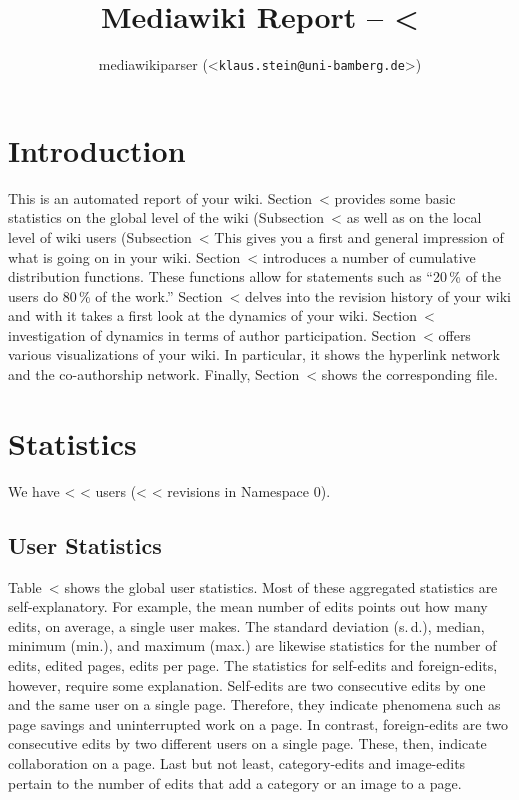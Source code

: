 \documentclass{scrartcl}
\title{Mediawiki Report -- <%
}
\author{mediawikiparser (<\texttt{klaus.stein@uni-bamberg.de}>)}
\begin{document}
\maketitle

\section{Introduction} %
\label{sec:introduction}

This is an automated report of your wiki. 
Section~<%
provides some basic statistics on the global level of the wiki 
(Subsection~<%
as well as on the local level of wiki users 
(Subsection~<%
This gives you a first and general impression of what is 
going on in your wiki. 
Section~<%
introduces a number of cumulative distribution functions. 
These functions allow for statements such as ``20\,\% of 
the users do 80\,\% of the work.'' 
Section~<%
delves into the revision history of your wiki and with it takes a 
first look at the dynamics of your wiki. 
Section~<%
investigation of dynamics in terms of author participation. 
Section~<%
offers various visualizations of your wiki. In particular, it shows 
the hyperlink network and the co-authorship network. Finally, 
Section~<%
shows the corresponding file.


\section{Statistics} %
\label{sec:statistics}

We have <%
<%
users (<%
<%
revisions in Namespace 0).

\subsection{User Statistics} %
\label{sub:user_statistics}

Table~<%
shows the global user statistics. Most of these aggregated statistics are self-explanatory. For example, the mean number of edits points out how many edits, on average, a single user makes. The standard deviation (s.\,d.), median, minimum (min.), and maximum (max.) are likewise statistics for the number of edits, edited pages, edits per page. The statistics for self-edits and foreign-edits, however, require some explanation. Self-edits are two consecutive edits by one and the same user on a single page. Therefore, they indicate phenomena such as page savings and uninterrupted work on a page. In contrast, foreign-edits are two consecutive edits by two different users on a single page. These, then, indicate collaboration on a page. Last but not least, category-edits and image-edits pertain to the number of edits that add a category or an image to a page.
\end{document}
